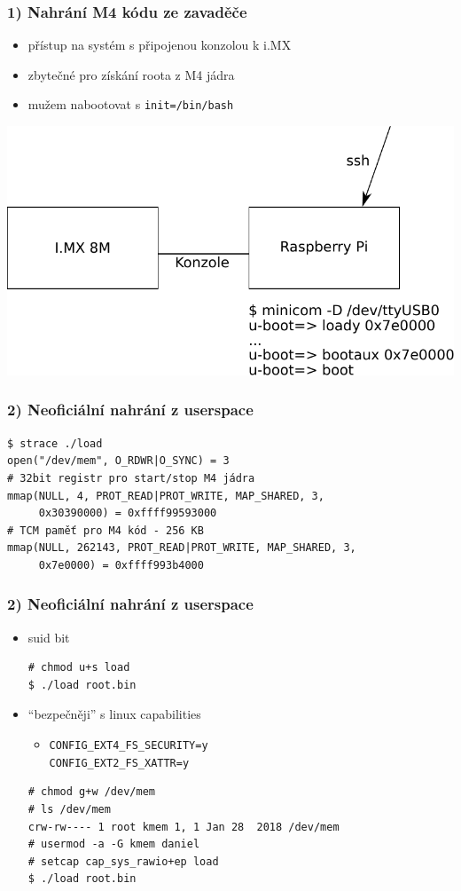 \documentclass{beamer}
\begin{document}
\begin{frame}[fragile]
\frametitle{1) Nahrání M4 kódu ze zavaděče}
\begin{itemize}
	\item přístup na systém s připojenou konzolou k i.MX
	\item zbytečné pro získání roota z M4 jádra
	\item mužem nabootovat s \texttt{init=/bin/bash}
\end{itemize}
\includegraphics[width=\linewidth]{figures/uboot}
\end{frame}

\begin{frame}[fragile]
\frametitle{2) Neoficiální nahrání z userspace}
\begin{verbatim}
$ strace ./load
open("/dev/mem", O_RDWR|O_SYNC) = 3
# 32bit registr pro start/stop M4 jádra
mmap(NULL, 4, PROT_READ|PROT_WRITE, MAP_SHARED, 3,
     0x30390000) = 0xffff99593000
# TCM paměť pro M4 kód - 256 KB
mmap(NULL, 262143, PROT_READ|PROT_WRITE, MAP_SHARED, 3,
     0x7e0000) = 0xffff993b4000
\end{verbatim}
\end{frame}

\begin{frame}[fragile]
\frametitle{2) Neoficiální nahrání z userspace}
\begin{itemize}
	\item suid bit
\begin{verbatim}
# chmod u+s load
$ ./load root.bin
\end{verbatim}

	\item ``bezpečněji'' s linux capabilities
	\begin{itemize}
		\item \texttt{CONFIG\_EXT4\_FS\_SECURITY=y} \\
				\texttt{CONFIG\_EXT2\_FS\_XATTR=y}
	\end{itemize}
\begin{verbatim}
# chmod g+w /dev/mem
# ls /dev/mem
crw-rw---- 1 root kmem 1, 1 Jan 28  2018 /dev/mem
# usermod -a -G kmem daniel
# setcap cap_sys_rawio+ep load
$ ./load root.bin
\end{verbatim}
\end{itemize}
\end{frame}
\end{document}
